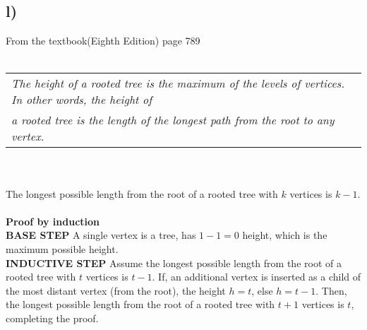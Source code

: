 \documentclass[11pt]{article}
\begin{document}
\subsection*{l)}
From the textbook(Eighth Edition) page 789
\\ \\
\begin{tabular}{l}
    \textit{The height of a rooted tree is the maximum of the levels of vertices. In other words, the height of} \\  
    \textit{a rooted tree is the length of the longest path from the root to any vertex.}  
\end{tabular}
\\ \\
The longest possible length from the root of a rooted tree with $k$ vertices is $k-1$.
\\ \\
\textbf{Proof by induction}\\
\textbf{BASE STEP} A single vertex is a tree, has $1-1=0$ height, which is the maximum possible height.\\
\textbf{INDUCTIVE STEP} Assume the longest possible length from the root of a rooted tree with $t$ vertices is $t-1$.
If, an additional vertex is inserted as a child of the most distant vertex (from the root), the height $h = t$, 
else $h = t-1$. Then, the longest possible length from the root of a rooted tree with 
$t+1$ vertices is $t$, completing the proof.   
\end{document}
